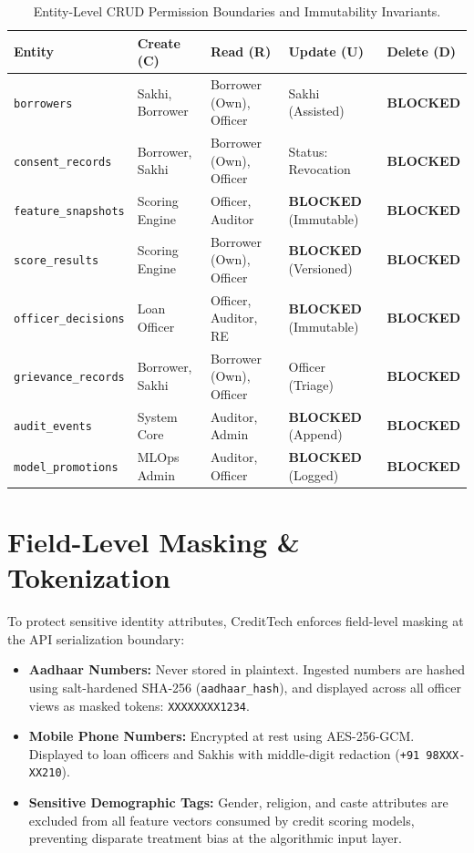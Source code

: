 \documentclass[11pt,a4paper,oneside]{report}
\begin{document}
\begin{table}[H]
\centering
\small
\renewcommand{\arraystretch}{1.2}
\begin{tabularx}{\textwidth}{l p{2.8cm} p{3.2cm} p{2.8cm} p{2.2cm}}
  \toprule
  \textbf{Entity} & \textbf{Create (C)} & \textbf{Read (R)} & \textbf{Update (U)} & \textbf{Delete (D)} \\
  \midrule
  \texttt{borrowers} & Sakhi, Borrower & Borrower (Own), Officer & Sakhi (Assisted) & \textbf{BLOCKED} \\
  \texttt{consent\_records} & Borrower, Sakhi & Borrower (Own), Officer & Status: Revocation & \textbf{BLOCKED} \\
  \texttt{feature\_snapshots}& Scoring Engine & Officer, Auditor & \textbf{BLOCKED} (Immutable) & \textbf{BLOCKED} \\
  \texttt{score\_results} & Scoring Engine & Borrower (Own), Officer & \textbf{BLOCKED} (Versioned) & \textbf{BLOCKED} \\
  \texttt{officer\_decisions} & Loan Officer & Officer, Auditor, RE & \textbf{BLOCKED} (Immutable) & \textbf{BLOCKED} \\
  \texttt{grievance\_records}& Borrower, Sakhi & Borrower (Own), Officer & Officer (Triage) & \textbf{BLOCKED} \\
  \texttt{audit\_events} & System Core & Auditor, Admin & \textbf{BLOCKED} (Append) & \textbf{BLOCKED} \\
  \texttt{model\_promotions}& MLOps Admin & Auditor, Officer & \textbf{BLOCKED} (Logged) & \textbf{BLOCKED} \\
  \bottomrule
\end{tabularx}
\caption{Entity-Level CRUD Permission Boundaries and Immutability Invariants.}
\label{tab:crud_matrix}
\end{table}

\section{Field-Level Masking \& Tokenization}
To protect sensitive identity attributes, CreditTech enforces field-level masking at the API serialization boundary:
\begin{itemize}
  \item \textbf{Aadhaar Numbers:} Never stored in plaintext. Ingested numbers are hashed using salt-hardened SHA-256 (\texttt{aadhaar\_hash}), and displayed across all officer views as masked tokens: \texttt{XXXXXXXX1234}.
  \item \textbf{Mobile Phone Numbers:} Encrypted at rest using AES-256-GCM. Displayed to loan officers and Sakhis with middle-digit redaction (\texttt{+91 98XXX-XX210}).
  \item \textbf{Sensitive Demographic Tags:} Gender, religion, and caste attributes are excluded from all feature vectors consumed by credit scoring models, preventing disparate treatment bias at the algorithmic input layer.
\end{itemize}
\end{document}
